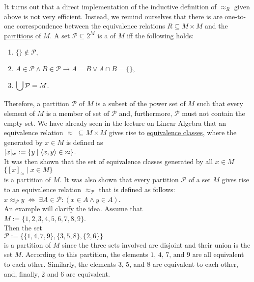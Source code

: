 It turns out that a direct implementation of the inductive definition of $\approx_R$ given above is
not very efficient.  Instead, we remind ourselves that there is are one-to-one correspondence
between the equivalence relations $R \subseteq M \times M$ and the
\href{https://en.wikipedia.org/wiki/Partition_of_a_set}{partitions} of $M$.  A set 
$\mathcal{P} \subseteq 2^M$ is a  of $M$ iff the following holds:
\begin{enumerate}
\item $\{\} \not\in \mathcal{P}$,
\item $A \in \mathcal{P} \wedge B \in \mathcal{P} \rightarrow A = B \vee A \cap B = \{\}$,
\item $\displaystyle\bigcup \mathcal{P} = M$.
\end{enumerate}
Therefore, a partition $\mathcal{P}$ of $M$ is a subset of the power set of $M$ such that
every element of $M$ is a member of  set of $\mathcal{P}$ and, furthermore, $\mathcal{P}$ must not contain the
empty set.  We have already seen in the lecture on Linear Algebra that an equivalence relation 
$\approx \;\subseteq M \times M$ gives rise to
\href{https://en.wikipedia.org/wiki/Equivalence_class}{equivalence classes}, 
where the  generated by $x \in M$ is defined as
\\[0.2cm]
\hspace*{1.3cm}
$[x]_\approx := \{ y \mid \pair(x, y) \in\; \approx \}$.
\\[0.2cm]
It was then shown that the set of equivalence classes generated by all $x \in M$ 
\\[0.2cm]
\hspace*{1.3cm}
$\bigl\{ [x]_\approx \;\big|\; x \in M \bigr\}$
\\[0.2cm]
is a partition of $M$.  It was also shown that every partition $\mathcal{P}$ of a set $M$ gives rise
to an equivalence relation $\approx_\mathcal{P}$ that is defined as follows:
\\[0.2cm]
\hspace*{1.3cm}
$x \approx_\mathcal{P} y \;\Longleftrightarrow\; \exists A \in \mathcal{P}:(x \in A \wedge y \in A)$.
\\[0.2cm]
An example will clarify the idea.  Assume that
\\[0.2cm]
\hspace*{1.3cm}
$M := \{ 1,2,3,4,5,6,7,8,9 \}$.
\\[0.2cm]
Then the set 
\\[0.2cm]
\hspace*{1.3cm}
$\mathcal{P} := \bigl\{ \{ 1, 4, 7, 9\}, \{3, 5, 8\}, \{2, 6\} \bigr\}$
\\[0.2cm]
is a partition of $M$ since the three sets involved are disjoint and their union is the set $M$.
According to this partition, the elements $1$, $4$, $7$, and $9$ are all
equivalent to each other.  Similarly, the elements $3$, $5$, and $8$ are equivalent to each other,
and, finally, $2$ and $6$ are equivalent.

